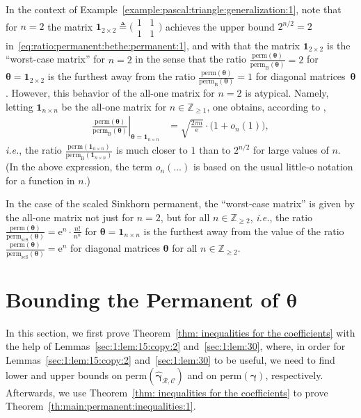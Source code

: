 \documentclass[journal,lettersize,twocolumn]{IEEEtran} %
\newcommand{\vect}[1]{ \bm{#1} }
\newcommand{\set}[1]{\mathcal{#1}}
\newcommand{\vgam}{ \vect{\gamma} }
\newcommand{\sZ}{\mathbb{Z}}
\newcommand{\matr}[1]{ \bm{#1} }
\newcommand{\defeq}{ \triangleq }
\newcommand{\perm}{ \mathrm{perm} }
\newcommand{\permb}{ \mathrm{perm}_{\mathrm{B}} }
\newcommand{\permscs}{ \mathrm{perm}_{\mathrm{scS}} }
\newcommand{\setC}{\set{C}}
\newcommand{\setR}{\set{R}}
\newcommand{\mtheta}{\matr{\theta}}
\newcommand{\hvgamRCp}{ \hat{\vgam}_{\setR,\setC} }
\newcommand{\ie}{\textit{i.e.}}
\newcommand{\e}{\mathrm{e}}
\begin{document}
%

In the context of Example~\ref{example:pascal:triangle:generalization:1}, note
that for $n = 2$ the matrix
$\matr{1}_{2 \times 2} \defeq \bigl( \begin{smallmatrix} 1 & 1 \\ 1 &
  1 \end{smallmatrix} \bigr)$ achieves the upper bound $2^{n/2} = 2$
in~\eqref{eq:ratio:permanent:bethe:permanent:1}, and with that the matrix
$\matr{1}_{2 \times 2}$ is the ``worst-case matrix'' for $n = 2$ in the sense
that the ratio $\frac{\perm(\mtheta)}{\permb(\mtheta)} = 2$ for
$\mtheta = \matr{1}_{2 \times 2}$ is the furthest away from the ratio
$\frac{\perm(\mtheta)}{\permb(\mtheta)} = 1$ for diagonal
matrices~$\mtheta$. However, this behavior of the all-one matrix for $n = 2$
is atypical. Namely, letting $\matr{1}_{n \times n}$ be the all-one matrix for
$n \in \sZ_{\geq 1}$, one obtains, according to
\cite[Lemma~48]{Vontobel2013a},
\begin{align*}
  \left.
    \frac{\perm(\mtheta)}{\permb(\mtheta)}
  \right|_{\mtheta = \matr{1}_{n \times n}}
    &= \sqrt{\frac{2 \pi n}{\e}}
       \cdot
       \bigl( 1 + o_n(1) \bigr),
\end{align*}
\ie, the ratio
$\frac{\perm(\matr{1}_{n \times n})}{\permb(\matr{1}_{n \times n})}$ is much
closer to $1$ than to $2^{n/2}$ for large values of $n$. (In the above
expression, the term $o_n(\ldots)$ is based on the usual little-o notation for
a function in $n$.)

%

In the case of the scaled Sinkhorn permanent, the ``worst-case matrix'' is
given by the all-one matrix not just for $n = 2$, but for all
$n \in \sZ_{\geq 2}$, \ie, the ratio
$\frac{\perm(\mtheta)}{\permscs(\mtheta)} = \e^n \cdot \frac{n!}{n^n}$ for
$\mtheta = \matr{1}_{n \times n}$ is the furthest away from the value of the
ratio $\frac{\perm(\mtheta)}{\permscs(\mtheta)} = \e^n$ for diagonal matrices
$\mtheta$ for all $n \in \sZ_{\geq 2}$.


%
%

\ifx\withclearpagecommands\x
\clearpage
\fi

\section{Bounding the Permanent of \texorpdfstring{$\mtheta$}{}}
\label{sec:5}

%
%

In this section, we first prove Theorem~\ref{thm: inequalities for the
  coefficients} with the help of Lemmas~\ref{sec:1:lem:15:copy:2}
and~\ref{sec:1:lem:30}, where, in order for Lemmas~\ref{sec:1:lem:15:copy:2}
and~\ref{sec:1:lem:30} to be useful, we need to find lower and upper bounds on
$\perm(\hvgamRCp)$ and on $\perm(\vgam)$, respectively. Afterwards, we use
Theorem~\ref{thm: inequalities for the coefficients} to prove
Theorem~\ref{th:main:permanent:inequalities:1}.
\end{document}
